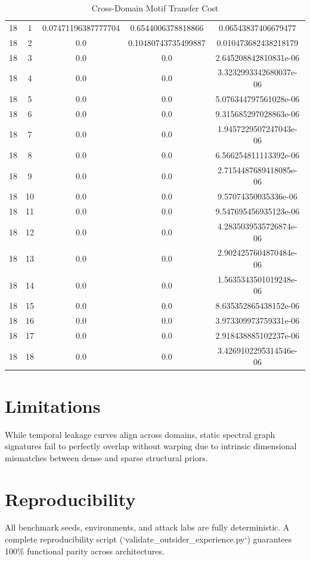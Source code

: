 \documentclass{article}
\begin{document}
\begin{table}[h]
\begin{tabular}{|c|c|c|c|c|}
18 & 1 & 0.07471196387777704 & 0.6544006378818866 & 0.06543837406679477 \\
18 & 2 & 0.0 & 0.10480743735499887 & 0.010473682438218179 \\
18 & 3 & 0.0 & 0.0 & 2.645208842810831e-06 \\
18 & 4 & 0.0 & 0.0 & 3.3232993342680037e-06 \\
18 & 5 & 0.0 & 0.0 & 5.076344797561028e-06 \\
18 & 6 & 0.0 & 0.0 & 9.315685297028863e-06 \\
18 & 7 & 0.0 & 0.0 & 1.9457229507247043e-06 \\
18 & 8 & 0.0 & 0.0 & 6.566254811113392e-06 \\
18 & 9 & 0.0 & 0.0 & 2.7154487689418085e-06 \\
18 & 10 & 0.0 & 0.0 & 9.57074350035336e-06 \\
18 & 11 & 0.0 & 0.0 & 9.547695456935123e-06 \\
18 & 12 & 0.0 & 0.0 & 4.2835039535726874e-06 \\
18 & 13 & 0.0 & 0.0 & 2.9024257604870484e-06 \\
18 & 14 & 0.0 & 0.0 & 1.5635343501019248e-06 \\
18 & 15 & 0.0 & 0.0 & 8.635352865438152e-06 \\
18 & 16 & 0.0 & 0.0 & 3.973309973759331e-06 \\
18 & 17 & 0.0 & 0.0 & 2.918438885102237e-06 \\
18 & 18 & 0.0 & 0.0 & 3.4269102295314546e-06 \\
\hline
\end{tabular}
\caption{Cross-Domain Motif Transfer Cost}
\label{tab:transfer}
\end{table}


\section{Limitations}
While temporal leakage curves align across domains, static spectral graph signatures fail to perfectly overlap without warping due to intrinsic dimensional mismatches between dense and sparse structural priors.

\section{Reproducibility}
All benchmark seeds, environments, and attack labs are fully deterministic. A complete reproducibility script (`validate_outsider_experience.py`) guarantees 100\% functional parity across architectures.
\end{document}
